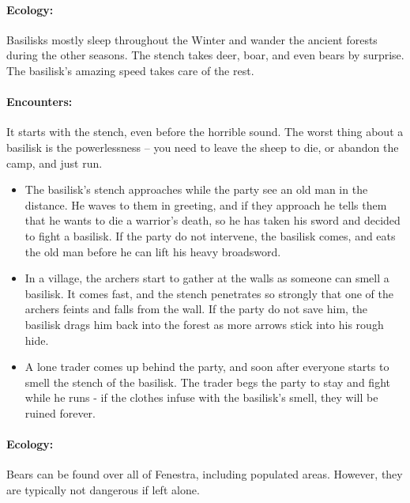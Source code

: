 \begin{multicols}{2}
\paragraph{Ecology:} Basilisks mostly sleep throughout the Winter and wander the ancient forests during the other seasons.
The stench takes deer, boar, and even bears by surprise.
The basilisk's amazing speed takes care of the rest.

\paragraph{Encounters:} It starts with the stench, even before the horrible sound.
The worst thing about a basilisk is the powerlessness -- you need to leave the sheep to die, or abandon the camp, and just run.

\begin{itemize}

  \item{The basilisk's stench approaches while the party see an old man in the distance.
  He waves to them in greeting, and if they approach he tells them that he wants to die a warrior's death, so he has taken his sword and decided to fight a basilisk.
  If the party do not intervene, the basilisk comes, and eats the old man before he can lift his heavy broadsword.}
  \item{In a village, the archers start to gather at the walls as someone can smell a basilisk.
  It comes fast, and the stench penetrates so strongly that one of the archers feints and falls from the wall.
  If the party do not save him, the basilisk drags him back into the forest as more arrows stick into his rough hide.}
  \item{A lone trader comes up behind the party, and soon after everyone starts to smell the stench of the basilisk.
  The trader begs the party to stay and fight while he runs - if the clothes infuse with the basilisk's smell, they will be ruined forever.
  }

\end{itemize}

\label{bear}

\paragraph{Ecology:} Bears can be found over all of Fenestra, including populated areas.  However, they are typically not dangerous if left alone.

\bear


\end{multicols}
